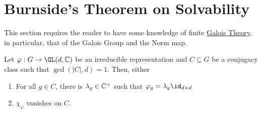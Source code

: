 \section{Burnside's Theorem on Solvability}

This section requires the reader to have some knowledge of finite \href{https://swayamchube.github.io/research-interests/galois/main.pdf}{Galois Theory}, in particular, that of the Galois Group and the Norm map.

\begin{lemma}
    Let $\varphi: G\to\GL(d,\bbC)$ be an irreducible representation and $C\subseteq G$ be a conjugacy class such that $\gcd(|C|, d) = 1$. Then, either 
    \begin{enumerate}[label=(\alph*)]
        \item For all $g\in C$, there is $\lambda_g\in\mathbb{C}^\times$ such that $\varphi_g = \lambda_g\id_{d\times d}$ 
        \item $\chi_\varphi$ vanishes on $C$.
    \end{enumerate}
\end{lemma}
